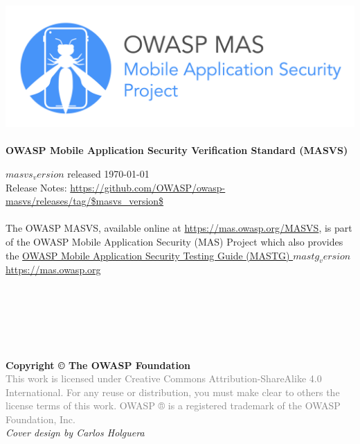 \thispagestyle{empty} %

\includegraphics[width=\textwidth]{Document/images/owasp_mas_header.png} \\ \\

\large{\textbf{OWASP Mobile Application Security Verification Standard (MASVS)} }

$masvs_version$ released \today \\

Release Notes: \url{https://github.com/OWASP/owasp-masvs/releases/tag/$masvs_version$} \\ \\


The OWASP MASVS, available online at \url{https://mas.owasp.org/MASVS}, is part of the OWASP Mobile Application Security (MAS) Project which also provides the \href{https://mas.owasp.org/MASTG}{OWASP Mobile Application Security Testing Guide (MASTG) $mastg_version$} \\

\url{https://mas.owasp.org} \\ \\ \\ \\ \\ \\ \\

\textbf{Copyright © The OWASP Foundation} \\

\footnotesize{\textcolor{gray}{This work is licensed under Creative Commons Attribution-ShareAlike 4.0 International. For any reuse or distribution, you must make clear to others the license terms of this work.
OWASP ® is a registered trademark of the OWASP Foundation, Inc.} }\\


\emph{Cover design by Carlos Holguera}